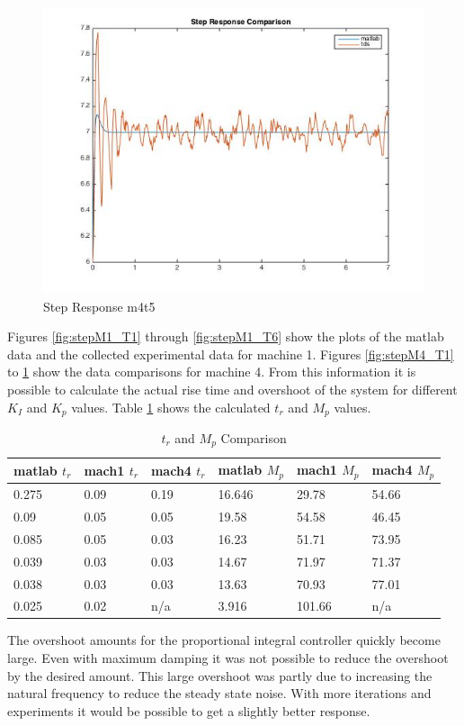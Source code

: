\documentclass[11pt,titlepage]{article}
\begin{document}
    \begin{figure}[H]
        \centering
        \includegraphics[scale=.3]{stepM4_T5}
        \caption{Step Response m4t5}
        \label{fig:stepM4_T5}
    \end{figure}
    \noindent Figures \ref{fig:stepM1_T1} through \ref{fig:stepM1_T6} show the plots of the matlab data and the collected experimental data for machine 1. Figures \ref{fig:stepM4_T1} to \ref{fig:stepM4_T5} show the data comparisons for machine 4. From this information it is possible to calculate the actual rise time and overshoot of the system for different $K_I$ and $K_p$ values. Table \ref{table:stepComp} shows the calculated $t_r$ and $M_p$ values.
    \begin{table}[H]
        \centering
        \begin{tabular}{|m{2cm}|m{2cm}|m{2cm}|m{2cm}|m{2cm}|m{2cm}|} 
            \hline
            matlab $t_r$ & mach1 $t_r$ & mach4 $t_r$ & matlab $M_p$ & mach1 $M_p$ & mach4 $M_p$\\ 
            \hline
            0.275 & 0.09 & 0.19 & 16.646 & 29.78 & 54.66 \\ 
            \hline
            0.09 & 0.05 & 0.05 & 19.58 & 54.58 & 46.45 \\ 
            \hline
            0.085 & 0.05 & 0.03 & 16.23 & 51.71 & 73.95 \\ 
            \hline
            0.039 & 0.03 & 0.03 & 14.67 & 71.97 & 71.37 \\ 
            \hline
            0.038 & 0.03 & 0.03 & 13.63 & 70.93 & 77.01 \\ 
            \hline
            0.025 & 0.02 & n/a & 3.916 & 101.66 & n/a \\ 
            \hline
        \end{tabular}
        \caption{$t_r$ and $M_p$ Comparison} \label{table:stepComp}
    \end{table}
    \noindent The overshoot amounts for the proportional integral controller quickly become large. Even with maximum damping it was not possible to reduce the overshoot by the desired amount. This large overshoot was partly due to increasing the natural frequency to reduce the steady state noise. With more iterations and experiments it would be possible to get a slightly better response.
\end{document}
